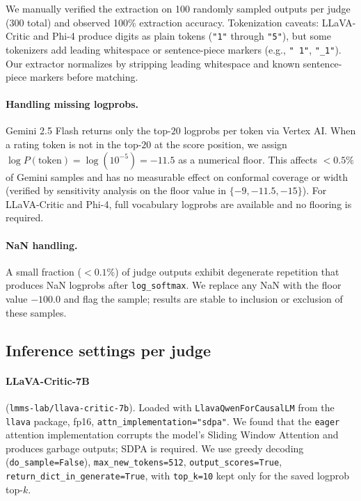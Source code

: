 \documentclass{article}
\begin{document}
We manually verified the extraction on 100 randomly sampled outputs per judge ($300$ total) and observed 100\% extraction accuracy. Tokenization caveats: LLaVA-Critic and Phi-4 produce digits as plain tokens (\texttt{"1"} through \texttt{"5"}), but some tokenizers add leading whitespace or sentence-piece markers (e.g., \texttt{"\,1"}, \texttt{"\_1"}). Our extractor normalizes by stripping leading whitespace and known sentence-piece markers before matching.

\paragraph{Handling missing logprobs.}
Gemini 2.5 Flash returns only the top-$20$ logprobs per token via Vertex AI. When a rating token is not in the top-$20$ at the score position, we assign $\log P(\text{token}) = \log(10^{-5}) = -11.5$ as a numerical floor. This affects $< 0.5\%$ of Gemini samples and has no measurable effect on conformal coverage or width (verified by sensitivity analysis on the floor value in $\{-9, -11.5, -15\}$). For LLaVA-Critic and Phi-4, full vocabulary logprobs are available and no flooring is required.

\paragraph{NaN handling.}
A small fraction ($< 0.1\%$) of judge outputs exhibit degenerate repetition that produces NaN logprobs after \texttt{log\_softmax}. We replace any NaN with the floor value $-100.0$ and flag the sample; results are stable to inclusion or exclusion of these samples.

\subsection{Inference settings per judge}
\label{app:judge_settings}

\paragraph{LLaVA-Critic-7B} (\texttt{lmms-lab/llava-critic-7b}). Loaded with \texttt{LlavaQwenForCausalLM} from the \texttt{llava} package, fp16, \texttt{attn\_implementation="sdpa"}. We found that the \texttt{eager} attention implementation corrupts the model's Sliding Window Attention and produces garbage outputs; SDPA is required. We use greedy decoding (\texttt{do\_sample=False}), \texttt{max\_new\_tokens=512}, \texttt{output\_scores=True}, \texttt{return\_dict\_in\_generate=True}, with \texttt{top\_k=10} kept only for the saved logprob top-$k$.
\end{document}
